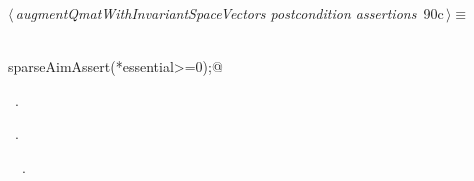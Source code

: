 \documentclass{article}
\begin{document}
\begin{flushleft} \small
\begin{minipage}{\linewidth}\label{scrap163}\raggedright\small
{} $\langle\,${\itshape augmentQmatWithInvariantSpaceVectors postcondition assertions}\nobreak\ {\footnotesize {90c}}$\,\rangle\equiv$
\vspace{-1ex}
\begin{list}{}{} \item
\mbox{}\verb@@\\
\mbox{}\verb@  sparseAimAssert(*essential>=0);@\\
\mbox{}\verb@@{\NWsep}
\end{list}
\vspace{-1.5ex}
\footnotesize
\begin{list}{}{\setlength{\itemsep}{-\parsep}\setlength{\itemindent}{-\leftmargin}}
\item \NWtxtMacroDefBy\ .
\item \NWtxtMacroRefIn\ .
\item \NWtxtIdentsUsed\nobreak\  \verb@essential@\nobreak\ .
\item{}
\end{list}
\end{minipage}\vspace{4ex}
\end{flushleft}
\end{document}

